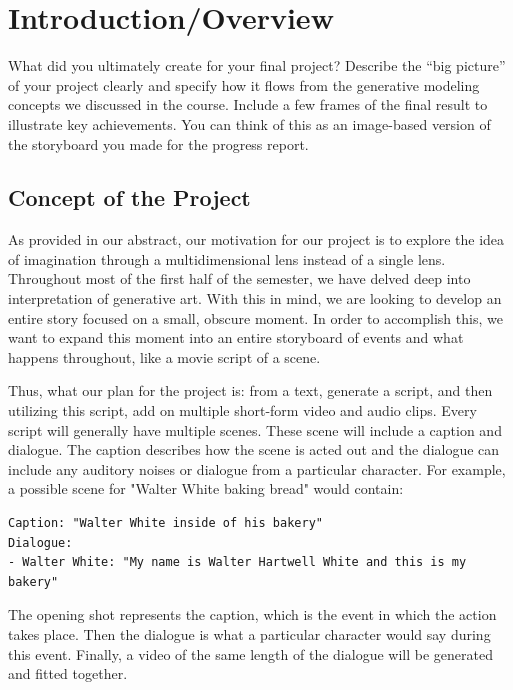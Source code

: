 \documentclass[conference]{IEEEtran}
\begin{document}
\section{Introduction/Overview}

\begin{tcolorbox}
What did you ultimately create for your final project? Describe the “big picture” of your project clearly and specify how it flows from the generative modeling concepts we discussed in the course. Include a few frames of the final result to illustrate key achievements. You can think of this as an image-based version of the storyboard you made for the progress report.
\end{tcolorbox}

\subsection{Concept of the Project}

As provided in our abstract, our motivation for our project is to explore the idea of imagination through a multidimensional lens instead of a single lens. Throughout most of the first half of the semester, we have delved deep into interpretation of generative art. With this in mind, we are looking to develop an entire story focused on a small, obscure moment. In order to accomplish this, we want to expand this moment into an entire storyboard of events and what happens throughout, like a movie script of a scene. 

Thus, what our plan for the project is: from a text, generate a script, and then utilizing this script, add on multiple short-form video and audio clips. Every script will generally have multiple scenes. These scene will include a caption and dialogue. The caption describes how the scene is acted out and the dialogue can include any auditory noises or dialogue from a particular character. For example, a possible scene for "Walter White baking bread" would contain:
\begin{lstlisting}
Caption: "Walter White inside of his bakery"
Dialogue: 
- Walter White: "My name is Walter Hartwell White and this is my bakery"
\end{lstlisting}
The opening shot represents the caption, which is the event in which the action takes place. Then the dialogue is what a particular character would say during this event. Finally, a video of the same length of the dialogue will be generated and fitted together.

\end{document}
